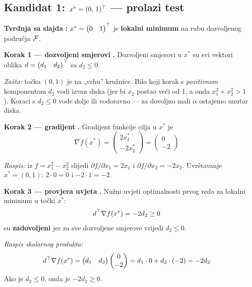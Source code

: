 \subsection{Kandidat 1: $x^{*} = (0,\,1)^{\top}$ --- prolazi test}

\textbf{Tvrdnja sa slajda} \textbf{:} $x^{*} = \begin{pmatrix} 0 & 1
\end{pmatrix}^{\top}$ je \textbf{lokalni minimum} na rubu dozvoljenog područja
$\mathcal{F}$.

\textbf{Korak 1 --- dozvoljeni smjerovi} \textbf{.} Dozvoljeni smjerovi
u $x^{*}$ su svi vektori oblika $d = \begin{pmatrix} d_1 & d_2\end{pmatrix}^{\top}$
sa $d_2 \le 0$.

\emph{Zašto:} točka $(0,1)$ je na „vrhu” kružnice. Bilo koji korak s
\emph{pozitivnom} komponentom $d_2$ vodi izvan diska (jer bi $x_2$ postao veći
od 1, a onda $x_1^2 + x_2^2 > 1$). Koraci s $d_2 \le 0$ vode dolje ili
vodoravno --- za dovoljno mali $\alpha$ ostajemo unutar diska.

\textbf{Korak 2 --- gradijent} \textbf{.} Gradijent funkcije cilja u
$x^{*}$ je
\[
\nabla f(x^{*}) = \begin{pmatrix} 2x_1^{*} \\ -2x_2^{*}\end{pmatrix}
= \begin{pmatrix} 0 \\ -2 \end{pmatrix}
\]

\emph{Raspis:} iz $f = x_1^2 - x_2^2$ slijedi
$\partial f/\partial x_1 = 2x_1$ i $\partial f/\partial x_2 = -2x_2$.
Uvrštavanje $x^{*} = (0,1)$: $2\cdot 0 = 0$ i $-2\cdot 1 = -2$. \checkmark

\textbf{Korak 3 --- provjera uvjeta} \textbf{.} Nužni uvjeti
optimalnosti prvog reda za lokalni minimum u točki $x^{*}$:
\[
d^{\top}\nabla f(x^{*}) = -2d_2 \ge 0
\]
su \textbf{zadovoljeni} jer za sve dozvoljene smjerove vrijedi $d_2 \le 0$.

\emph{Raspis skalarnog produkta:}
\[
d^{\top}\nabla f(x^{*})
= \begin{pmatrix} d_1 & d_2\end{pmatrix}
  \begin{pmatrix} 0 \\ -2\end{pmatrix}
= d_1 \cdot 0 + d_2 \cdot (-2) = -2d_2
\]
Ako je $d_2 \le 0$, onda je $-2d_2 \ge 0$. \checkmark

